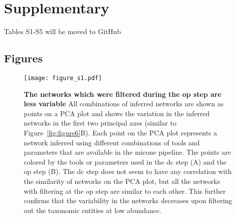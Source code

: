 
\newpage
\section*{Supplementary}

  {\color{red} Tables S1-S5 will be moved to GitHub}

  \renewcommand{\thefigure}{S\arabic{figure}}
  \setcounter{figure}{0}

  \renewcommand{\thetable}{S\arabic{table}}
  \setcounter{table}{0}

  

  \subsection*{Figures}

    \begin{figure}[H]
      \centering
      \texttt{[image: figure\_s1.pdf]}
    \end{figure}
    \begin{figure}[H]
      \centering
        \caption{
          \textbf{The networks which were filtered during the \ac{op} step are less variable}
          All combinations of inferred networks are shown as points on a PCA plot and shows the variation in the inferred networks in the first two principal axes (similar to Figure~\ref{fig:figure6}B).
          Each point on the PCA plot represents a network inferred using different combinations of tools and parameters that are available in the \ac{micone} pipeline.
          The points are colored by the tools or parameters used in the \ac{dc} step (A) and the \ac{op} step (B).
          The \ac{dc} step does not seem to have any correlation with the similarity of networks on the PCA plot, but all the networks with filtering at the \ac{op} step are similar to each other.
          This further confirms that the variability in the networks decreases upon filtering out the taxonomic entities at low abundance.
        }
      \label{fig:figure_s1}
    \end{figure}
    \FloatBarrier
    \newpage

